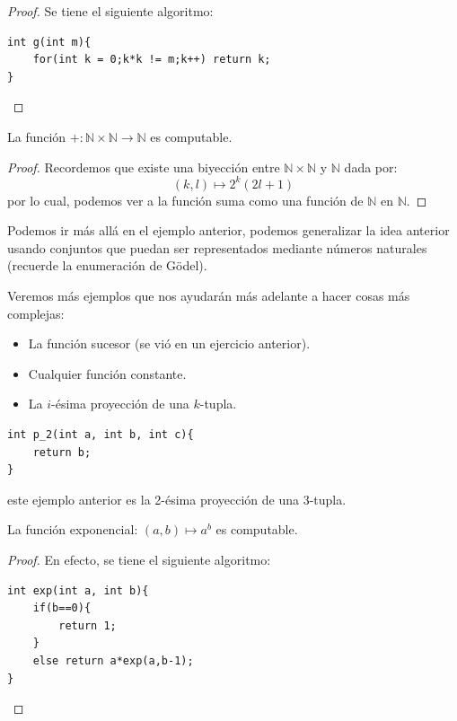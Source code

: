 \documentclass[12pt]{report}
\newcounter{it}
\theoremstyle{largebreak}
\newcommand\cf[3]{\ensuremath{#1:#2\rightarrow#3}}
\begin{document}
    \begin{proof}
        Se tiene el siguiente algoritmo:
        \begin{lstlisting}
int g(int m){
    for(int k = 0;k*k != m;k++) return k;
}
        \end{lstlisting}
    \end{proof}

    \begin{exa}
        La función $\cf{+}{\mathbb{N}\times\mathbb{N}}{\mathbb{N}}$ es computable.
    \end{exa}

    \begin{proof}
        Recordemos que existe una biyección entre $\mathbb{N}\times\mathbb{N}$ y $\mathbb{N}$ dada por:
        \begin{equation*}
            (k,l)\mapsto 2^k(2l+1)
        \end{equation*}
        por lo cual, podemos ver a la función suma como una función de $\mathbb{N}$ en $\mathbb{N}$.
    \end{proof}

    \begin{obs}
        Podemos ir más allá en el ejemplo anterior, podemos generalizar la idea anterior usando conjuntos que puedan ser representados mediante números naturales (recuerde la enumeración de Gödel).
    \end{obs}

    Veremos más ejemplos que nos ayudarán más adelante a hacer cosas más complejas:

    \begin{itemize}
        \item La función sucesor (se vió en un ejercicio anterior).
        \item Cualquier función constante.
        \item La $i$-ésima proyección de una $k$-tupla.
    \end{itemize}
    \begin{lstlisting}
int p_2(int a, int b, int c){
    return b;
}
    \end{lstlisting}
    este ejemplo anterior es la 2-ésima proyección de una 3-tupla.

    \begin{exa}
        La función exponencial: $(a,b)\mapsto a^{b}$ es computable.
    \end{exa}

    \begin{proof}
        En efecto, se tiene el siguiente algoritmo:
        \begin{lstlisting}
int exp(int a, int b){
    if(b==0){
        return 1;
    }
    else return a*exp(a,b-1);
}
        \end{lstlisting}
    \end{proof}
\end{document}
